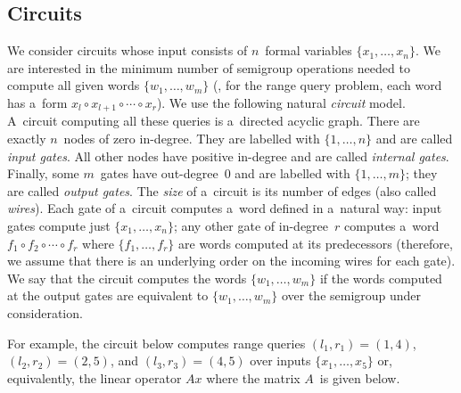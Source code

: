 \documentclass{toc}
\begin{document}
\subsection{Circuits}\label{subsec:circuits}
We consider circuits whose input consists of $n$~formal variables
$\{x_1, \dotsc, x_n\}$. We are interested in the minimum number of semigroup
operations needed to compute all given words $\{w_1, \dotsc, w_m\}$ (\eg, for
the range query problem, 
each word has a~form $x_l\circ x_{l+1}\circ \dotsb \circ x_r$).
We use
the following natural \emph{circuit} model. A~circuit computing all these queries
is a~directed acyclic graph. There are exactly $n$~nodes of zero in-degree. They
are labelled with $\{1, \dotsc, n\}$ and are called \emph{input gates}. All
other nodes have positive in-degree and are called 
\emph{internal gates}.
Finally, some
$m$~gates have out-degree~0 and are labelled with $\{1, \dotsc, m\}$; they are
called \emph{output gates}.
The
\emph{size} of a~circuit is its number of edges (also called \emph{wires}). Each
gate of a~circuit computes a~word defined in a~natural way: input gates compute
just $\{x_1, \dotsc, x_n\}$; any other gate of in-degree~$r$ computes a~word
$f_1 \circ f_2 \circ \dotsb \circ f_r$ where $\{f_1, \dotsc, f_r\}$ are words
computed at its predecessors (therefore, we assume that there is an underlying
order on the incoming wires for each gate). We say that the circuit computes the
words $\{w_1, \dotsc, w_m\}$ if the words computed at the output gates are
equivalent to $\{w_1, \dotsc, w_m\}$ over the %
semigroup under consideration.  %

For example, the circuit below computes range queries
$(l_1,r_1)=(1,4)$,
$(l_2,r_2)=(2,5)$, and
$(l_3,r_3)=(4,5)$
over inputs $\{x_1, \dotsc, x_5\}$ or, equivalently, the
linear operator $Ax$ where the matrix $A$~is given below.

\vspace{5mm}
\begin{center}
\end{center}
\vspace{5mm}
\end{document}
